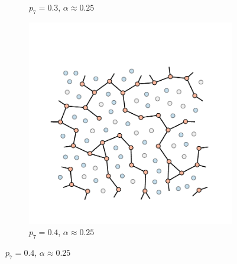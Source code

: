 \begin{figure}[bt]
\begin{subfigure}[b]{0.3\textwidth}
         \caption{$p_7=0.3$, $\alpha\approx0.25$}
         \label{fig:percp7b}
     \end{subfigure}
     \hfill
      \begin{subfigure}[b]{0.3\textwidth}
         \centering
         \includegraphics[width=\textwidth]{./figures/targeted_opt/percolation_p7_4.pdf}
         \caption{$p_7=0.4$, $\alpha\approx0.25$}
         \label{fig:percp7c}
     \end{subfigure}
     

\end{figure}
